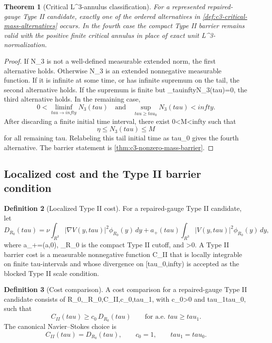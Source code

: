\documentclass[11pt]{amsart}
\def\({}%
\def\){}%
\def\tilde#1{#1}%
\def\mathfrak#1{#1}%
\def\mathrm#1{#1}%
\def\mathbb#1{#1}%
\def\tau{tau}%
\def\infty{infty}%
\theoremstyle{plain}
\newtheorem{theorem}{Theorem}[section]
\theoremstyle{definition}
\newtheorem{definition}[theorem]{Definition}
\theoremstyle{remark}
\begin{document}
\begin{theorem}[\texorpdfstring{Critical \(L^3\)-annulus classification}{Critical L3-annulus classification}]
\label{thm:c3-l3-annulus-classification}
For a represented repaired-gauge Type II candidate, exactly one of the ordered
alternatives in \cref{def:c3-critical-mass-alternatives} occurs.  In the fourth
case the compact Type II barrier remains valid with the positive finite
critical annulus in place of exact unit \(L^3\)-normalization.
\end{theorem}

\begin{proof}
If \(N_3\) is not a well-defined measurable extended norm, the first
alternative holds.  Otherwise \(N_3\) is an extended nonnegative measurable
function.  If it is infinite at some time, or has infinite supremum on the
tail, the second alternative holds.  If the supremum is finite but
\(\liminf_{\tau\to\infty}N_3(\tau)=0\), the third alternative holds.  In the
remaining case,
\[
  0<\liminf_{\tau\to\infty}N_3(\tau)
  \quad\text{and}\quad
  \sup_{\tau\ge\tau_0}N_3(\tau)<\infty.
\]
After discarding a finite initial time interval, there exist
\(0<\eta\le M<\infty\) such that
\[
  \eta\le N_3(\tau)\le M
\]
for all remaining \(\tau\).  Relabeling this tail initial time as \(\tau_0\)
gives the fourth alternative.  The barrier statement is
\cref{thm:c3-nonzero-mass-barrier}.
\end{proof}

\subsection{Localized cost and the Type II barrier condition}

\begin{definition}[Localized Type II cost]
\label{def:c4-localized-cost}
For a repaired-gauge Type II candidate, let
\[
  \tilde{\mathfrak D}_{R_0}(\tau)
  =
  \nu\int_{\mathbb R^3}|\nabla V(y,\tau)|^2\phi_{R_0}(y)\,dy
  +
  a_+(\tau)\int_{\mathbb R^3}|V(y,\tau)|^2\phi_{R_0}(y)\,dy,
\]
where \(a_+=\max(a,0)\), \(\phi_{R_0}\) is the compact Type II cutoff, and
\(\nu>0\).  A Type II barrier cost is a measurable nonnegative function
\(\mathfrak C_{\mathrm{II}}\) that is locally integrable on finite
\(\tau\)-intervals and whose divergence on \([\tau_0,\infty)\) is accepted as
the blocked Type II scale condition.
\end{definition}

\begin{definition}[Cost comparison]
\label{def:c4-cost-comparison}
A cost comparison for a repaired-gauge Type II candidate consists of
\(R_0,\phi_{R_0},\mathfrak C_{\mathrm{II}},c_0,\tau_1\), with \(c_0>0\) and
\(\tau_1\ge\tau_0\), such that
\[
  \mathfrak C_{\mathrm{II}}(\tau)
  \ge c_0\,\tilde{\mathfrak D}_{R_0}(\tau)
  \qquad\text{for a.e. }\tau\ge\tau_1.
\]
The canonical Navier--Stokes choice is
\[
  \mathfrak C_{\mathrm{II}}(\tau)=\tilde{\mathfrak D}_{R_0}(\tau),
  \qquad c_0=1,\qquad \tau_1=\tau_0.
\]
\end{definition}
\end{document}
